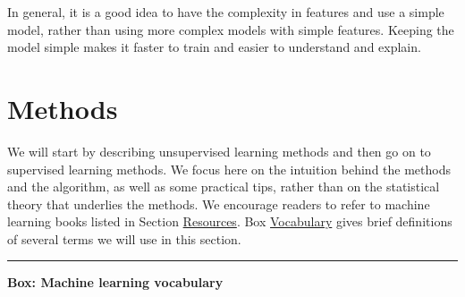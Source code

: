 \documentclass[]{krantz}
\begin{document}
In general, it is a good idea to have the complexity in features and use
a simple model, rather than using more complex models with simple
features. Keeping the model simple makes it faster to train and easier
to understand and explain.

\section{Methods}\label{methods}

We will start by describing unsupervised learning methods and then go on
to supervised learning methods. We focus here on the intuition behind
the methods and the algorithm, as well as some practical tips, rather
than on the statistical theory that underlies the methods. We encourage
readers to refer to machine learning books listed in Section
\protect\hyperlink{ml:res}{Resources}. Box
\protect\hyperlink{box:ml3}{Vocabulary} gives brief definitions of
several terms we will use in this section.

\begin{center}\rule{0.5\linewidth}{\linethickness}\end{center}

\textbf{Box: Machine learning vocabulary}
\end{document}
